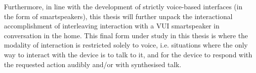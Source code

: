 Furthermore, in line with the development of strictly voice-based interfaces (in the form of smartspeakers), this thesis will further unpack the interactional accomplishment of interleaving interaction with a \ac{VUI} smartspeaker in conversation in the home.
This final form under study in this thesis is where the modality of interaction is restricted solely to voice, i.e. situations where the only way to interact with the device is to talk to it, and for the device to respond with the requested action audibly and/or with synthesised talk.

